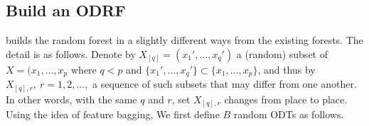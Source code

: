 \documentclass[nojss]{jss}
\numberwithin{equation}{section}
\DeclareMathOperator*{\argmax}{arg\,max}
\def\P{{\mathbf P}}
\def\S{{\cal S}}
\begin{document}
\subsection{Build an ODRF }

 builds the random forest in a slightly different ways from the existing forests. The detail is as follows.
Denote by $ X_{[q]} = (x_1', ..., x_q')$ a (random) subset of $ X  = (x_1, ..., x_p $ where $ q < p$ and $ \{x_1', ..., x_q'\} \subset \{x_1, ..., x_p\} $, and thus  by $X_{[q], r},\ r=1, 2, ...,$  a sequence of such subsets that may differ from one another.  In other words, with the same $ q $ and $ r$,  set $X_{[q], r}$ changes from place to place.
Using the idea of feature bagging, We first define $B$  random ODTs as follows.  %
\end{document}
